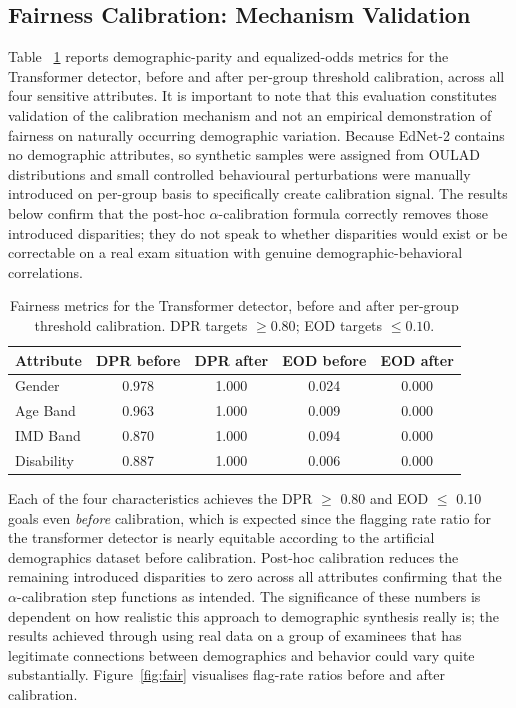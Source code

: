 \documentclass[sigconf]{acmart}
\begin{document}
\subsection{Fairness Calibration: Mechanism Validation}
Table ~\ref{tab:fairness_results} reports demographic-parity and equalized-odds metrics for the Transformer detector, before and after per-group threshold calibration, across all four sensitive attributes. It is important to note that this evaluation constitutes validation of the calibration mechanism and not an empirical demonstration of fairness on naturally occurring demographic variation. Because EdNet-2 contains no demographic attributes, so synthetic samples were assigned from OULAD distributions and small controlled behavioural perturbations were manually introduced on per-group basis to specifically create calibration signal. The results below confirm that the post-hoc $\alpha$-calibration formula correctly removes those introduced disparities; they do not speak to whether disparities would exist or be correctable on a real exam situation with genuine demographic-behavioral correlations.

\begin{table}[htbp]
\caption{Fairness metrics for the Transformer detector, before and after per-group threshold calibration. DPR targets $\geq 0.80$; EOD targets $\leq 0.10$.}
\label{tab:fairness_results}
\centering
\small
\begin{tabular}{lcccc}
\toprule
\textbf{Attribute} & \textbf{DPR before} & \textbf{DPR after} & \textbf{EOD before} & \textbf{EOD after} \\
\midrule
Gender        & 0.978 & 1.000 & 0.024 & 0.000 \\
Age Band      & 0.963 & 1.000 & 0.009 & 0.000 \\
IMD Band      & 0.870 & 1.000 & 0.094 & 0.000 \\
Disability    & 0.887 & 1.000 & 0.006 & 0.000 \\
\bottomrule
\end{tabular}
\end{table}

Each of the four characteristics achieves the DPR $\geq$ 0.80 and EOD $\leq$ 0.10 goals even \emph{before} calibration, which is expected since the flagging rate ratio for the transformer detector is nearly equitable according to the artificial demographics dataset before calibration. Post-hoc calibration reduces the remaining introduced disparities to zero across all attributes confirming that the $\alpha$-calibration step functions as intended. The significance of these numbers is dependent on how realistic this approach to demographic synthesis really is; the results achieved through using real data on a group of examinees that has legitimate connections between demographics and behavior could vary quite substantially. Figure~\ref{fig:fair} visualises flag-rate ratios before and after calibration.
\end{document}
